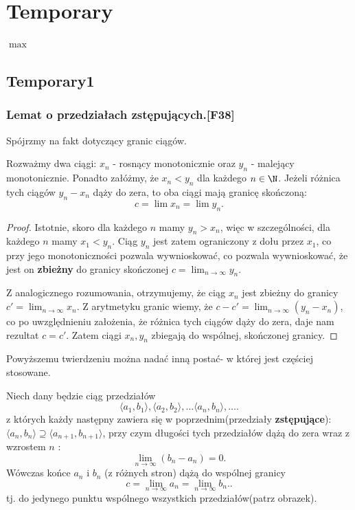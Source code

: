 \chapter{Temporary}

$\max$

\section{Temporary1}
\subsection{Lemat o przedziałach zstępujących.[F38]}
Spójrzmy na fakt dotyczący granic ciągów.

\begin{theorem}
Rozważmy dwa ciągi: $x_{n}$ - rosnący monotonicznie oraz $y_{n}$ - malejący monotonicznie. Ponadto załóżmy, że $x_{n}<y_{n}$ dla każdego $n\in \N$. 
Jeżeli różnica tych ciągów $y_{n}-x_{n}$ dąży do zera, to oba ciągi mają granicę skończoną:
         \[
         c = \lim x_{n}= \lim y_{n}
         .\] 
\end{theorem} 
\begin{proof}
	Istotnie, skoro dla każdego $n$ mamy $y_{n}>x_{n}$, więc w szczególności, dla każdego $n$ mamy $x_{1}< y_{n}$. Ciąg $y_{n}$ jest zatem ograniczony z dołu przez $x_{1}$, co przy jego monotoniczności pozwala wywnioskować, co pozwala wywnioskować, że jest on \textbf{zbieżny} do granicy skończonej $c = \lim_{n \to \infty} y_{n}$.

	Z analogicznego rozumowania, otrzymujemy, że ciąg $x_{n}$ jest zbieżny do granicy $c' = \lim_{n \to \infty} x_{n}$. Z arytmetyku granic wiemy, że $c-c'= \lim_{n \to \infty} \left( y_{n}-x_{n} \right)$, co po uwzględnieniu założenia, że różnica tych ciągów dąży do zera, daje nam rezultat $c=c'$. Zatem ciągi  $x_{n}, y_{n}$ zbiegają do wspólnej, skończonej granicy. 
\end{proof} 

Powyższemu twierdzeniu można nadać inną postać- w której jest częściej stosowane.
\begin{lemma}
	Niech dany będzie ciąg przedziałów
	\[
	\langle a_1,b_1 \rangle ,\langle a_2,b_2 \rangle,\ldots\langle a_{n}, b_{n} \rangle,\ldots
	.\] 
	z których każdy następny zawiera się w poprzednim(przedziały \textbf{zstępujące}): $\langle a_{n},b_{n} \rangle \supseteq \langle a_{n+1}, b_{n+1} \rangle $, przy czym długości tych przedziałów dążą do zera wraz z wzrostem $n$ :
	\[
	\lim_{n \to \infty} (b_{n}-a_{n}) = 0
	.\] 
	Wówczas końce $a_{n}$ i $b_{n}$ (z różnych stron) dążą do wspólnej granicy \[
	c = \lim_{n \to \infty} a_{n}= \lim_{n \to \infty} b_{n}.
	.\] 
        tj. do jedynego punktu wspólnego wszystkich przedziałów(patrz obrazek).
\end{lemma} 

